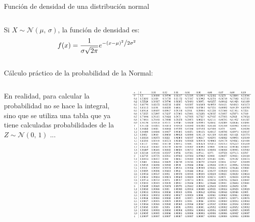 \documentclass[11pt]{beamer}
\begin{document}
\begin{frame}{Función de densidad de una distribución normal}  
\begin{columns}
\begin{column}{0.4\textwidth}
\begin{block}{}
Si $
X \sim \mathcal{N}(\mu,\,\sigma)
    $, la función de densidad es:
    $$f(x)=\frac{1}{{\sigma \sqrt {2\pi } }}e^{{{ - \left( {x - \mu } \right)^2 } \mathord{\left/ {\vphantom {{ - \left( {x - \mu } \right)^2 } {2\sigma ^2 }}} \right. \kern-\nulldelimiterspace} {2\sigma ^2 }}}$$
\end{block}
\end{column}
\begin{column}{0.6\textwidth}

\end{column}
\end{columns}{}

\end{frame}

\begin{frame}{Cálculo práctico de la probabilidad de la Normal:}
\begin{columns}
\begin{column}{0.4\textwidth}
\begin{block}{}
En realidad, para calcular la probabilidad no se hace la integral, sino que se utiliza una tabla que ya tiene calculadas probabilidades de la  $Z \sim \mathcal{N}(0,\,1)
    $ ...
\end{block}
\end{column}
\begin{column}{0.6\textwidth}
\includegraphics[page=1,width=1\textwidth]{probabilidad/distribucion_normal}
\end{column}
\end{columns}


\end{frame}
\end{document}
